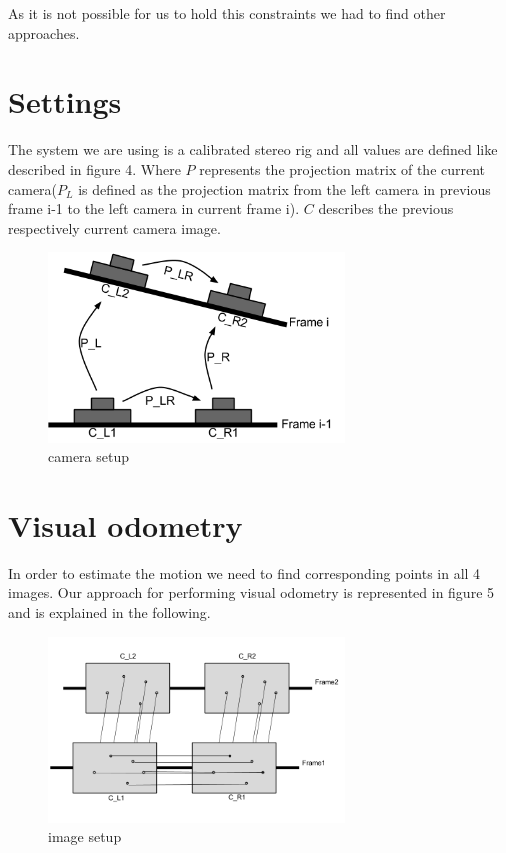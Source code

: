 \documentclass[11pt]{article}
\begin{document}
	As it is not possible for us to hold this constraints we had to find other approaches.

	\section{Settings}
The system we are using is a calibrated stereo rig \cite{malik-hiller-2015} and all values are defined like described in figure 4. Where $P$ represents the projection matrix of the current camera($P_L$ is defined as the projection matrix from the left camera in previous frame i-1 to the left camera in current frame i). $C$ describes the previous respectively current camera image.
	
	\begin{figure}[H]
		\centering
		\includegraphics[width=0.7\textwidth]{images/camera_setup.png}
		\caption{camera setup}
	\end{figure}
	
	\newpage
	
	\section{Visual odometry}
	In order to estimate the motion we need to find corresponding points in all 4 images. Our approach for performing visual odometry is represented in figure 5 and is explained in the following.
	
	\begin{figure}[H]
		\centering
		\includegraphics[width=0.7\textwidth]{images/image_setup.png}
		\caption{image setup}
	\end{figure}
	
\end{document}
